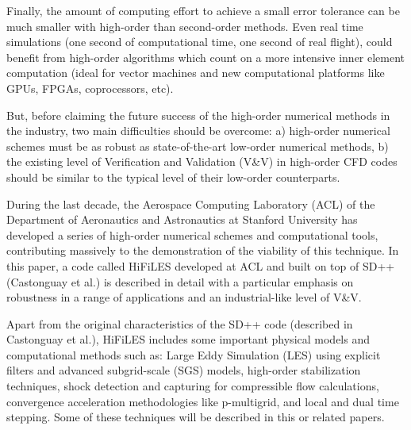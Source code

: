 Finally, the amount of computing effort to achieve a small error tolerance can be much smaller with high-order than second-order methods. Even real time simulations (one second of computational time, one second of real flight), could benefit from high-order algorithms which count on a more intensive inner element computation (ideal for vector machines and new computational platforms like GPUs, FPGAs, coprocessors, etc).

But, before claiming the future success of the high-order numerical methods in the industry, two main difficulties should be overcome: a) high-order numerical schemes must be as robust as state-of-the-art low-order numerical methods, b) the existing level of Verification and Validation (V\&V) in high-order CFD codes should be similar to the typical level of their low-order counterparts.

During the last decade, the Aerospace Computing Laboratory (ACL) of the Department of Aeronautics and Astronautics at Stanford University has developed a series of high-order numerical schemes and computational tools, contributing massively to the demonstration of the viability of this technique. In this paper, a code called HiFiLES developed at ACL and built on top of SD++ (Castonguay et al.\cite{castonguay2011}) is described in detail with a particular emphasis on robustness in a range of applications and an industrial-like level of V\&V. %

Apart from the original characteristics of the SD++ code (described in Castonguay et al.\cite{castonguay2011}), HiFiLES includes some important physical models and computational methods such as: Large Eddy Simulation (LES) using explicit filters and advanced subgrid-scale (SGS) models, high-order stabilization techniques, shock detection and capturing for compressible flow calculations, convergence acceleration methodologies like p-multigrid, and local and dual time stepping. Some of these techniques will be described in this or related papers.

